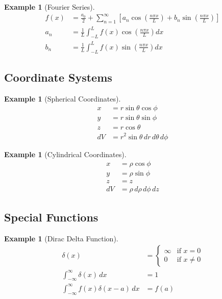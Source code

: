 \documentclass{article}
\newtheorem{example}[theorem]{Example}
\begin{document}
\begin{example}[Fourier Series]
\begin{align*}
    f(x) &= \frac{a_0}{2} + \sum_{n=1}^{\infty} \left[a_n\cos\left(\frac{n\pi x}{L}\right) + b_n\sin\left(\frac{n\pi x}{L}\right)\right] \\
    a_n &= \frac{1}{L}\int_{-L}^L f(x)\cos\left(\frac{n\pi x}{L}\right)dx \\
    b_n &= \frac{1}{L}\int_{-L}^L f(x)\sin\left(\frac{n\pi x}{L}\right)dx
\end{align*}
\end{example}

\subsection{Coordinate Systems}

\begin{example}[Spherical Coordinates]
\begin{align*}
    x &= r\sin\theta\cos\phi \\
    y &= r\sin\theta\sin\phi \\
    z &= r\cos\theta \\
    dV &= r^2\sin\theta \, dr \, d\theta \, d\phi
\end{align*}
\end{example}

\begin{example}[Cylindrical Coordinates]
\begin{align*}
    x &= \rho\cos\phi \\
    y &= \rho\sin\phi \\
    z &= z \\
    dV &= \rho \, d\rho \, d\phi \, dz
\end{align*}
\end{example}

\subsection{Special Functions}

\begin{example}[Dirac Delta Function]
\begin{align*}
    \delta(x) &= \begin{cases}
        \infty & \text{if } x = 0 \\
        0 & \text{if } x \neq 0
    \end{cases} \\
    \int_{-\infty}^{\infty} \delta(x) \, dx &= 1 \\
    \int_{-\infty}^{\infty} f(x)\delta(x-a) \, dx &= f(a)
\end{align*}
\end{example}
\end{document}
